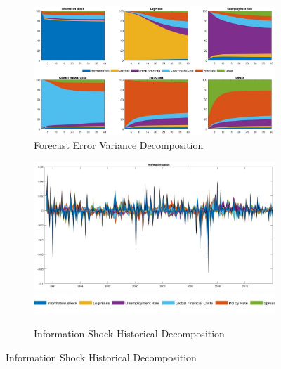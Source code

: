 \documentclass[11pt,a4paper]{article}
\begin{document}
    \begin{figure}[hp]
        \centering

        \begin{subfigure}{\textwidth}
            \centering
            \includegraphics[scale=.32]{Graphs/forecast_err_variance_decomp.jpg}
            \captionsetup{font=scriptsize}
            \caption{Forecast Error Variance Decomposition}
            \label{fig:fevd}
        \end{subfigure}
        
        \vspace{0.2cm} %
        
        \begin{subfigure}{\textwidth}
            \centering
            \includegraphics[scale=.32]{Graphs/INFO_FF4_HD.jpg}
            \includegraphics*[scale=0.22]{Graphs/Inkedlegend.jpg}
            \captionsetup{font=scriptsize}
            \caption{Information Shock Historical Decomposition}
            \label{fig:INFOhd}
        \end{subfigure}


\end{figure}
\end{document}
